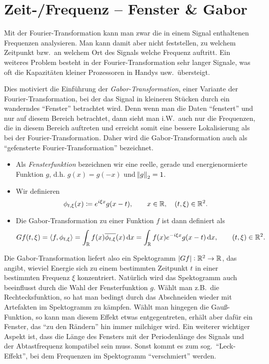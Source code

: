 \section{Zeit-/Frequenz -- Fenster \& Gabor}

Mit der Fourier-Transformation kann man zwar die in einem Signal enthaltenen Frequenzen analysieren.
Man kann damit aber nicht feststellen, zu welchem Zeitpunkt bzw.\ an welchem Ort des Signals
welche Frequenz auftritt. Ein weiteres Problem besteht in der Fourier-Transformation sehr langer
Signale, was oft die Kapazitäten kleiner Prozessoren in Handys usw.\ übersteigt.

Dies motiviert die Einführung der \emph{Gabor-Transformation}, einer Variante der 
Fourier-Transformation, bei der das Signal in kleineren Stücken durch ein wanderndes 
\enquote{Fenster} betrachtet wird. Denn wenn man die Daten \enquote{fenstert} und nur auf diesem 
Bereich betrachtet, dann sieht man i.W.\ auch nur die Frequenzen, die in diesem Bereich auftreten
und erreicht somit eine bessere Lokalisierung als bei der Fourier-Transformation. Daher wird die 
Gabor-Transformation auch als \enquote{gefensterte Fourier-Transformation} bezeichnet.

\begin{definition}\leavevmode
\begin{itemize}
\item Als \emph{Fensterfunktion} bezeichnen wir eine reelle, gerade und energienormierte Funktion
  $ g $, d.h. $ g(x) = g(-x) $ und $ \norm{g}_{2} = 1 $.
\item Wir definieren
  \[
    \phi_{t, \xi}(x) \coloneqq e^{i\xi x} g(x - t), \qquad x \in \mathbb{R}, \quad (t, \xi) \in \mathbb{R}^{2}.
  \]
\item Die Gabor-Transformation zu einer Funktion $ f $ ist dann definiert als
  \[
      Gf(t,\xi)
    = \langle f, \phi_{t,\xi} \rangle
    = \int_{\R} f(x) \overline{\phi_{t, \xi}}(x) \dif x
    = \int_{\R} f(x) e^{-i \xi x} g(x - t) \dif x,
      \qquad (t, \xi) \in \R^{2}.
  \]
\end{itemize}
\end{definition}

\begin{remark}
Die Gabor-Transformation liefert also ein Spektogramm $ |Gf| : \mathbb{R}^{2} \rightarrow \mathbb{R} $, das angibt,
wieviel Energie sich zu einem bestimmten Zeitpunkt $ t $ in einer bestimmten Frequenz $ \xi $
konzentriert. Natürlich wird das Spektogramm auch beeinflusst durch die Wahl der Fensterfunktion
$ g $. Wählt man z.B.\ die Rechtecksfunktion, so hat man bedingt durch das Abschneiden wieder mit
Artefakten im Spektogramm zu kämpfen. Wählt man hingegen die Gauß-Funktion, so kann man diesem
Effekt etwas entgegentreten, erhält aber dafür ein Fenster, das \enquote{zu den Rändern} hin immer
milchiger wird. Ein weiterer wichtiger Aspekt ist, dass die Länge des Fensters mit der Periodenlänge
des Signals und der Abtastfrequenz kompatibel sein muss. Sonst kommt es zum sog.\ \enquote{Leck-
Effekt}, bei dem Frequenzen im Spektogramm \enquote{verschmiert} werden.
\end{remark}

